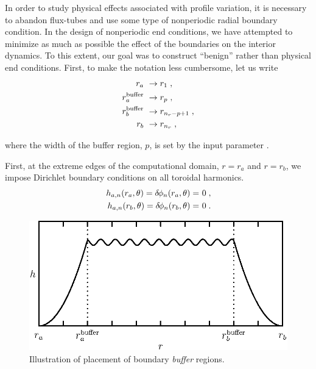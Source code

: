 In order to study physical effects associated with profile 
variation, it is necessary to abandon flux-tubes and use 
some type of nonperiodic radial boundary condition.  In the 
design of nonperiodic end conditions, we have attempted to 
minimize as much as possible the effect of the boundaries 
on the interior dynamics.  To this extent, our goal was 
to construct ``benign'' rather than physical end conditions.
First, to make the notation less cumbersome, let us write
%
\begin{align}
r_a &~\rightarrow r_1 \; , \\
r_a^{\rm buffer} &~\rightarrow r_p \; , \\
r_b^{\rm buffer} &~\rightarrow r_{n_r-p+1} \; , \\
r_b &~\rightarrow r_{n_r} \; , 
\end{align}

\noindent
where the width of the buffer region, $p$, is set by the input 
parameter .

First, at the extreme edges of the computational domain, $r=r_a$ 
and $r=r_b$, we impose Dirichlet boundary conditions on all 
toroidal harmonics.
%
\begin{align}
h_{a,n}(r_a,\theta) = \delta \hskip -1pt \phi_n(r_a,\theta) = &~0 \; , \\
h_{a,n}(r_b,\theta) = \delta \hskip -1pt \phi_n(r_b,\theta) = &~0 \; .
\end{align}

\begin{figure}
\begin{center}
\includegraphics[scale=1.0]{figures/boundary.eps}
\caption{Illustration of placement of boundary {\it buffer} regions.}
\label{fig.boundary}
\end{center}
\end{figure}

